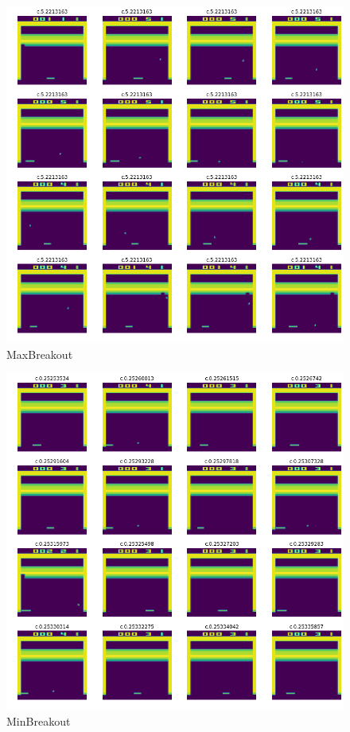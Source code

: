 \documentclass[12pt,a4paper,openright,twoside]{article}
\numberwithin{equation}{section}
\theoremstyle{definition}
\theoremstyle{remark}
\theoremstyle{plain}
\begin{document}
\begin{figure}[h]
    \centering
    \includegraphics[width=\textwidth]{MaxBreakout}
    \caption{MaxBreakout}
    \label{fig:MaxBreakout}
\end{figure}

\begin{figure}[h]
    \centering
    \includegraphics[width=\textwidth]{MinBreakout}
    \caption{MinBreakout}
    \label{fig:MinBreakout}
\end{figure}
\end{document}
